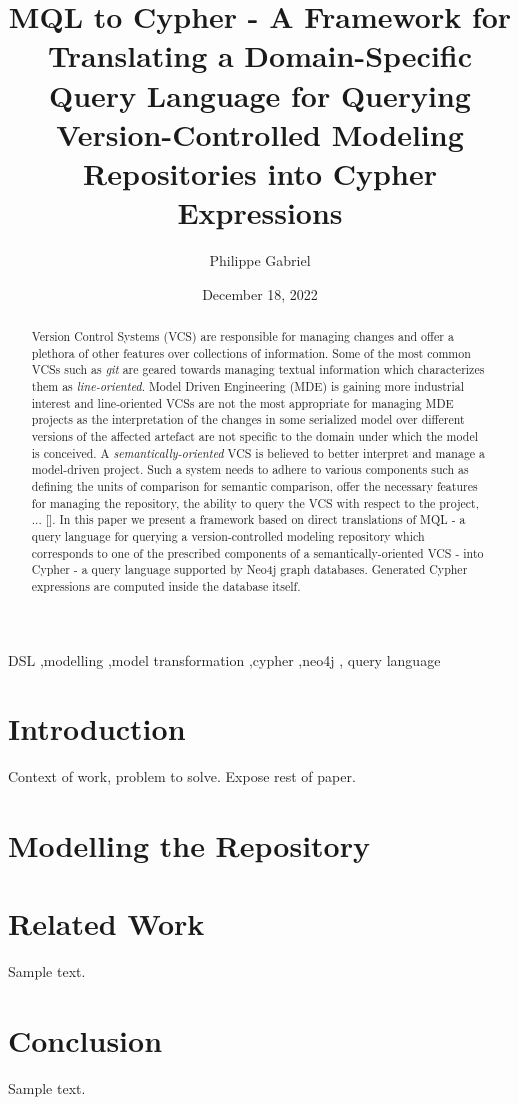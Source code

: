 \documentclass[final,3p,times,twocolumn,12pt,authoryear]{elsarticle}
\begin{document}
\begin{frontmatter}
  \title{MQL to Cypher - A Framework for Translating a Domain-Specific Query
    Language for Querying Version-Controlled Modeling Repositories into Cypher
    Expressions}
  \author{Philippe Gabriel}
  \date{December 18, 2022}

  \begin{abstract}
    Version Control Systems (VCS) are responsible for managing changes and offer
    a plethora of other features over collections of information. Some of the
    most common VCSs such as \textit{git} are geared towards managing textual
    information which characterizes them as \textit{line-oriented}. Model Driven
    Engineering (MDE) is gaining more industrial interest and line-oriented VCSs
    are not the most appropriate for managing MDE projects as the interpretation
    of the changes in some serialized model over different versions of the
    affected artefact are not specific to the domain under which the model is
    conceived. A \textit{semantically-oriented} VCS is believed to better
    interpret and manage a model-driven project. Such a system needs to adhere
    to various components such as defining the units of comparison for semantic
    comparison, offer the necessary features for managing the repository, the
    ability to query the VCS with respect to the project, ... [\cite{dsvcs}]. In
    this paper we present a framework based on direct translations of MQL - a
    query language for querying a version-controlled modeling repository which
    corresponds to one of the prescribed components of a semantically-oriented
    VCS - into Cypher - a query language supported by Neo4j graph
    databases. Generated Cypher expressions are computed inside the database
    itself.
  \end{abstract}

  \begin{keyword}
    DSL \sep modelling \sep model transformation \sep cypher \sep neo4j \sep
    query language
  \end{keyword}

\end{frontmatter}

\section{Introduction}
Context of work, problem to solve.
Expose rest of paper.

\section{Modelling the Repository}

\section{Related Work}
Sample text.

\section{Conclusion}
Sample text.

 

\end{document}
